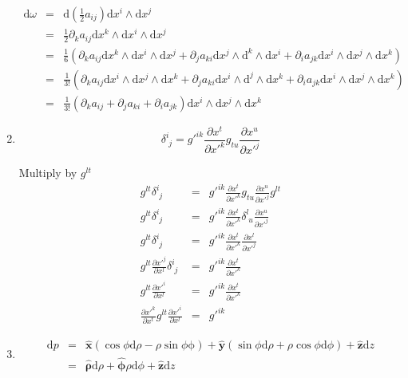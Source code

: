 \documentclass[12pt,a4paper]{article}
\begin{document}
\begin{enumerate}
\begin{eqnarray*}
	\mathrm d\omega &=& \mathrm d (\frac 12 a_{ij}) \mathrm dx^i\wedge\mathrm dx^j \\
	&=& \frac{1}{2}\partial_k a_{ij} \mathrm dx^k \wedge \mathrm dx^i \wedge \mathrm dx^j \\
	&=& \frac 1 6 (\partial_k a_{ij}\mathrm dx^k\wedge\mathrm dx^i\wedge\mathrm dx^j + \partial_j a_{ki}\mathrm dx^j\wedge\mathrm d^k\wedge\mathrm dx^i + \partial_i a_{jk}\mathrm dx^i\wedge\mathrm dx^j\wedge\mathrm dx^k) \\
	&=& \frac 1{3!}(\partial_k a_{ij}\mathrm dx^i\wedge\mathrm dx^j\wedge\mathrm dx^k + \partial_j a_{ki}\mathrm dx^i\wedge\mathrm d^j\wedge\mathrm dx^k + \partial_i a_{jk}\mathrm dx^i\wedge\mathrm dx^j\wedge\mathrm dx^k) \\
	&=& \frac 1{3!}(\partial_k a_{ij} + \partial_j a_{ki} + \partial_i a_{jk})\mathrm dx^i\wedge\mathrm dx^j\wedge\mathrm dx^k
\end{eqnarray*}


\item

\begin{equation}
	\delta^i_{\phantom ij} = g'^{ik} \frac{\partial x^t}{\partial x'^k} g_{tu}\frac{\partial x^u}{\partial x'^{j}}
\end{equation}

Multiply by $g^{lt}$
\begin{eqnarray*}
	g^{lt} \delta^i_{\phantom ij} &=& g'^{ik} \frac{\partial x^t}{\partial x'^k} g_{tu}\frac{\partial x^u}{\partial x'^{j}}g^{lt} \\
	g^{lt} \delta^i_{\phantom ij} &=& g'^{ik} \frac{\partial x^t}{\partial x'^k} \delta^l_{\phantom l u}\frac{\partial x^u}{\partial x'^{j}} \\
	g^{lt}\delta^i_{\phantom ij} &=& g'^{ik} \frac{\partial x^t}{\partial x'^k} \frac{\partial x^l}{\partial x'^{j}} \\
	g^{lt} \frac{\partial x'^{j}}{\partial x^l} \delta^i_{\phantom ij}&=& g'^{ik} \frac{\partial x^t}{\partial x'^k}\\
	g^{lt} \frac{\partial x'^{i}}{\partial x^l}&=& g'^{ik} \frac{\partial x^t}{\partial x'^k} \\
		 \frac{\partial x'^k}{\partial x^t} g^{lt} \frac{\partial x'^{i}}{\partial x^l}&=& g'^{ik}
\end{eqnarray*}





\item
\begin{eqnarray*}
	\mathrm dp &=& \mathbf{\hat x}( \cos\phi\mathrm d\rho -\rho\sin\phi\mathrm \phi ) + \mathbf{\hat y} (\sin\phi\mathrm d \rho + \rho\cos\phi\mathrm d\phi) + \mathbf {\hat z} \mathrm d z \\
	&=& \mathbf{\hat \rho} \mathrm d\rho + \mathbf{\hat \phi} \rho \mathrm d \phi + \mathbf{\hat z} \mathrm dz
\end{eqnarray*}


\end{enumerate}
\end{document}
